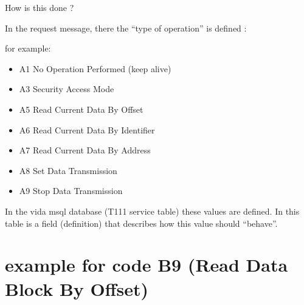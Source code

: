 \documentclass[letterpaper,10pt,english]{sphinxmanual}
\begin{document}
\sphinxAtStartPar
How is this done ?

\sphinxAtStartPar
In the request message, there the “type of operation” is defined :

\sphinxAtStartPar
for example:
\begin{itemize}
\item {} 
\sphinxAtStartPar
A1 No Operation Performed (keep alive)

\item {} 
\sphinxAtStartPar
A3 Security Access Mode

\item {} 
\sphinxAtStartPar
A5 Read Current Data By Offset

\item {} 
\sphinxAtStartPar
A6 Read Current Data By Identifier

\item {} 
\sphinxAtStartPar
A7 Read Current Data By Address

\item {} 
\sphinxAtStartPar
A8 Set Data Transmission

\item {} 
\sphinxAtStartPar
A9 Stop Data Transmission

\end{itemize}

\sphinxAtStartPar
In the vida msql database (T111 service table) these values are defined.
In this table is a field (definition) that describes how this value should “behave”.


\section{example for code B9 (Read Data Block By Offset)}
\label{\detokenize{makingsense/respons:example-for-code-b9-read-data-block-by-offset}}
\begin{sphinxVerbatim}[commandchars=\\\{\}]
\end{sphinxVerbatim}
\end{document}
